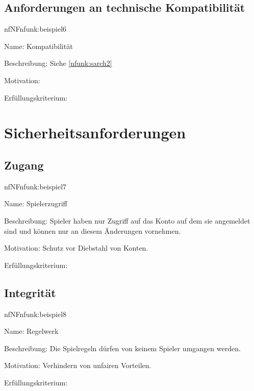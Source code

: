 \subsection{Anforderungen an technische Kompatibilität}

\begin{description}[leftmargin=5em, style=sameline]	
	\begin{lhp}{nf}{NF}{nfunk:beispiel6}
		\item [Name:] Kompatibilität
		\item [Beschreibung:] Siehe \ref{nfunk:sarch2}
		\item [Motivation:]
		\item [Erfüllungskriterium:] 
	\end{lhp}
\end{description}

\section{Sicherheitsanforderungen}

\subsection{Zugang}

\begin{description}[leftmargin=5em, style=sameline]	
	\begin{lhp}{nf}{NF}{nfunk:beispiel7}
		\item [Name:] Spielerzugriff
		\item [Beschreibung:] Spieler haben nur Zugriff auf das Konto auf dem sie angemeldet sind und können nur an diesem Änderungen vornehmen.
		\item [Motivation:] Schutz vor Diebstahl von Konten.
		\item [Erfüllungskriterium:] 
	\end{lhp}
\end{description}

\subsection{Integrität}

\begin{description}[leftmargin=5em, style=sameline]	
	\begin{lhp}{nf}{NF}{nfunk:beispiel8}
		\item [Name:] Regelwerk
		\item [Beschreibung:] Die Spielregeln dürfen von keinem Spieler umgangen werden.
		\item [Motivation:] Verhindern von unfairen Vorteilen.
		\item [Erfüllungskriterium:] 
	\end{lhp}
\end{description}

